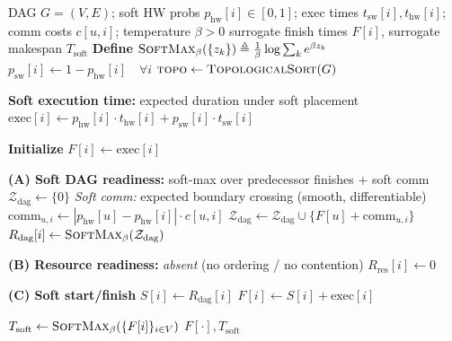 \begin{algorithm}[!htbp]
\caption{DiffSchedule--NoOrder (Differentiable surrogate for Diff-GNN w/o ordering)}
\label{alg:diff_no_order_clean}
\scriptsize
\begin{algorithmic}[1]
\Require DAG $G=(V,E)$; soft HW probs $p_{\mathrm{hw}}[i]\in[0,1]$; exec times $t_{\mathrm{sw}}[i],t_{\mathrm{hw}}[i]$; comm costs $c[u,i]$; temperature $\beta>0$
\Ensure surrogate finish times $F[i]$, surrogate makespan $T_{\mathrm{soft}}$
\State \textbf{Define} $\textsc{SoftMax}_\beta(\{z_k\}) \triangleq \frac{1}{\beta}\log\sum_k e^{\beta z_k}$
\State $p_{\mathrm{sw}}[i]\gets 1-p_{\mathrm{hw}}[i]\quad \forall i$
\State $\textsc{topo}\gets\textsc{TopologicalSort}(G)$

\Statex \textbf{Soft execution time:} expected duration under soft placement
    \State $\text{exec}[i]\gets p_{\mathrm{hw}}[i]\cdot t_{\mathrm{hw}}[i] + p_{\mathrm{sw}}[i]\cdot t_{\mathrm{sw}}[i]$
\EndFor

\Statex \textbf{Initialize} $F[i]\gets \text{exec}[i]$ 

    \Statex \textbf{(A) Soft DAG readiness:} soft-max over predecessor finishes + soft comm
    \State $\mathcal{Z}_{\mathrm{dag}}\gets \{0\}$
        \Statex \quad \emph{Soft comm:} expected boundary crossing (smooth, differentiable)
        \State $\text{comm}_{u,i}\gets |p_{\mathrm{hw}}[u]-p_{\mathrm{hw}}[i]|\cdot c[u,i]$
        \State $\mathcal{Z}_{\mathrm{dag}}\gets \mathcal{Z}_{\mathrm{dag}}\cup\{F[u]+\text{comm}_{u,i}\}$
    \EndFor
    \State $R_{\mathrm{dag}}[i]\gets \textsc{SoftMax}_\beta(\mathcal{Z}_{\mathrm{dag}})$

    \Statex \textbf{(B) Resource readiness:} \emph{absent} (no ordering / no contention)
    \State $R_{\mathrm{res}}[i]\gets 0$

    \Statex \textbf{(C) Soft start/finish}
    \State $S[i]\gets R_{\mathrm{dag}}[i]$
    \State $F[i]\gets S[i]+\text{exec}[i]$
\EndFor

\State $T_{\mathrm{soft}}\gets \textsc{SoftMax}_\beta(\{F[i]\}_{i\in V})$
\State \Return $F[\cdot], T_{\mathrm{soft}}$
\end{algorithmic}
\end{algorithm}


